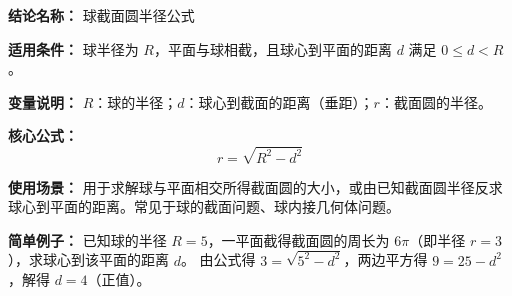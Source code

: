 \textbf{结论名称：} 球截面圆半径公式

\textbf{适用条件：} 球半径为 $R$，平面与球相截，且球心到平面的距离 $d$ 满足 $0 \le d < R$。

\textbf{变量说明：} $R$：球的半径；$d$：球心到截面的距离（垂距）；$r$：截面圆的半径。

\textbf{核心公式：} \[ \boxed{r = \sqrt{R^{2} - d^{2}}} \]

\textbf{使用场景：} 用于求解球与平面相交所得截面圆的大小，或由已知截面圆半径反求球心到平面的距离。常见于球的截面问题、球内接几何体问题。

\textbf{简单例子：} 已知球的半径 $R=5$，一平面截得截面圆的周长为 $6\pi$（即半径 $r=3$），求球心到该平面的距离 $d$。
由公式得 $3 = \sqrt{5^{2} - d^{2}}$，两边平方得 $9 = 25 - d^{2}$，解得 $d = 4$（正值）。